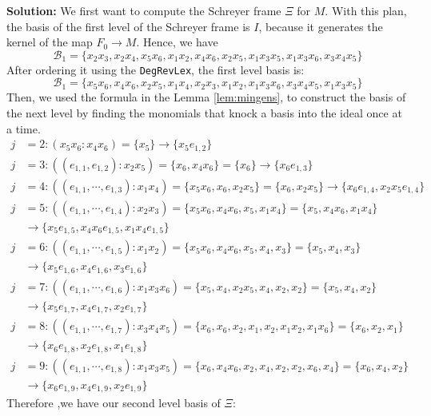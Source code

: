 \documentclass{article}
\theoremstyle{definition}
\theoremstyle{remark}
\theoremstyle{example}
\begin{document}
\textbf{Solution:} We first want to compute the Schreyer frame $\Xi$ for $M$. With this plan, the basis of the first level of the Schreyer frame is $I$, because it generates the kernel of the map $F_0 \rightarrow M$. Hence, we have 
\begin{equation}
    \mathcal{B}_1 = \{x_2x_3,x_2x_4,x_5x_6,x_1x_2,x_4x_6,x_2x_5,x_1x_3x_5,x_1x_3x_6,x_3x_4x_5\}
\end{equation}
After ordering it using the \verb+DegRevLex+, the first level basis is:
\begin{equation}
    \mathcal{B}_1 = \{x_5x_6,x_4x_6,x_2x_5,x_1x_4,x_2x_3,x_1x_2,x_1x_3x_6,x_3x_4x_5,x_1x_3x_5\}
\end{equation}
Then, we used the formula in the Lemma \ref{lem:mingens}, to construct the basis of the next level by finding the monomials that knock a basis into the ideal once at a time.
\begin{align}
    j &= 2: (x_5x_6:x_4x_6) = \{x_5\} \rightarrow \{x_5e_{1,2}\}\\
    j &= 3: ((e_{1,1},e_{1,2}):x_2x_5) = \{x_6,x_4x_6\} = \{x_6\} \rightarrow \{x_6e_{1,3}\}\\
    j &= 4: ((e_{1,1},\cdots,e_{1,3}):x_1x_4) = \{x_5x_6,x_6,x_2x_5\} = \{x_6,x_2x_5\} \rightarrow \{x_6e_{1,4},x_2x_5e_{1,4}\}\\
    j &= 5: ((e_{1,1},\cdots,e_{1,4}):x_2x_3) = \{x_5x_6,x_4x_6,x_5,x_1x_4\} = \{x_5,x_4x_6,x_1x_4\}\\
    &\rightarrow \{x_5e_{1,5},x_4x_6e_{1,5},x_1x_4e_{1,5}\}\\
    j &= 6: ((e_{1,1},\cdots,e_{1,5}):x_1x_2) = \{x_5x_6,x_4x_6,x_5,x_4,x_3\} = \{x_5,x_4,x_3\}\\
    &\rightarrow \{x_5e_{1,6},x_4e_{1,6},x_3e_{1,6}\}\\
    j &= 7: ((e_{1,1},\cdots,e_{1,6}):x_1x_3x_6) = \{x_5,x_4,x_2x_5,x_4,x_2,x_2\} = \{x_5,x_4,x_2\}\\
    &\rightarrow \{x_5e_{1,7},x_4e_{1,7},x_2e_{1,7}\}\\
    j &= 8: ((e_{1,1},\cdots,e_{1,7}):x_3x_4x_5) = \{x_6,x_6,x_2,x_1,x_2,x_1x_2,x_1x_6\} = \{x_6,x_2,x_1\}\\
    &\rightarrow \{x_6e_{1,8},x_2e_{1,8},x_1e_{1,8}\}\\
    j &= 9: ((e_{1,1},\cdots,e_{1,8}):x_1x_3x_5) = \{x_6,x_4x_6,x_2,x_4,x_2,x_2,x_6,x_4\} = \{x_6,x_4,x_2\}\\
    &\rightarrow \{x_6e_{1,9},x_4e_{1,9},x_2e_{1,9}\}
\end{align}
Therefore ,we have our second level basis of $\Xi$:
\end{document}
